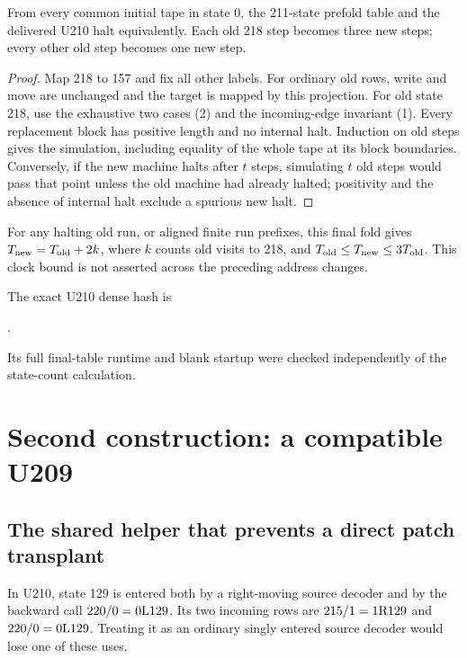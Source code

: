 \begin{lemma}
From every common initial tape in state 0, the 211-state prefold table and
the delivered U210 halt equivalently. Each old 218 step becomes three new
steps; every other old step becomes one new step.
\end{lemma}
\begin{proof}
Map 218 to 157 and fix all other labels. For ordinary old rows, write and move
are unchanged and the target is mapped by this projection. For old state 218,
use the exhaustive two cases (2) and the incoming-edge invariant (1).
Every replacement block has positive length and no internal halt.
Induction on old steps gives the simulation, including equality of the whole
tape at its block boundaries. Conversely, if the new machine halts after
\(t\) steps, simulating \(t\) old steps would pass that point unless the old
machine had already halted; positivity and the absence of internal halt
exclude a spurious new halt.
\end{proof}

For any halting old run, or aligned finite run prefixes, this final fold gives
\(T_{\rm new}=T_{\rm old}+2k\), where \(k\) counts old visits to 218, and
\(T_{\rm old}\le T_{\rm new}\le3T_{\rm old}\).
This clock bound is not asserted across the preceding address changes.

The exact U210 dense hash is
\begin{center}\small
{}.
\end{center}
Its full final-table runtime and blank startup were checked independently of
the state-count calculation.

\section{Second construction: a compatible U209}\label{sec:u209}

\subsection{The shared helper that prevents a direct patch transplant}
In U210, state 129 is entered both by a right-moving source decoder and by
the backward call \(220/0=0\mathrm{L}129\). Its two incoming rows are
\(215/1=1\mathrm{R}129\) and \(220/0=0\mathrm{L}129\).
Treating it as an ordinary singly entered source decoder would lose one
of these uses.

